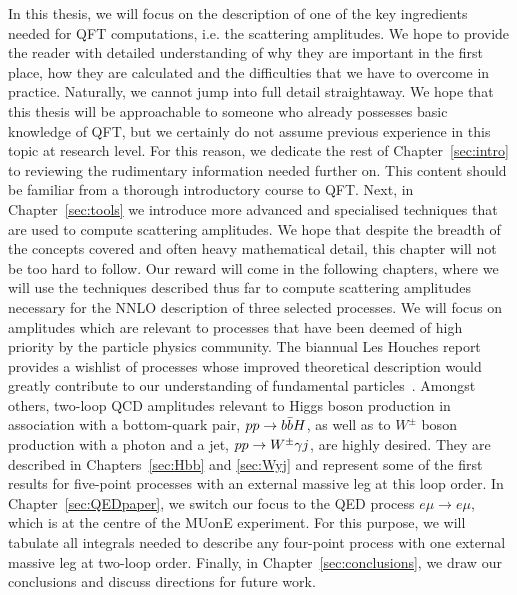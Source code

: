 \documentclass[main.tex]{subfiles}
\begin{document}
In this thesis, we will focus on the description of one of the key ingredients needed for QFT computations, i.e. the scattering amplitudes. We hope to provide the reader with detailed understanding of why they are important in the first place, how they are calculated and the difficulties that we have to overcome in practice. Naturally, we cannot jump into full detail straightaway. We hope that this thesis will be approachable to someone who already possesses basic knowledge of QFT, but we certainly do not assume previous experience in this topic at research level. For this reason, we dedicate the rest of Chapter~\ref{sec:intro} to reviewing the rudimentary information needed further on. This content should be familiar from a thorough introductory course to QFT. Next, in Chapter~\ref{sec:tools} we introduce more advanced and specialised techniques that are used to compute scattering amplitudes. We hope that despite the breadth of the concepts covered and often heavy mathematical detail, this chapter will not be too hard to follow. Our reward will come in the following chapters, where we will use the techniques described thus far to compute scattering amplitudes necessary for the NNLO description of three selected processes. We will focus on amplitudes which are relevant to processes that have been deemed of high priority by the particle physics community. The biannual Les Houches report provides a wishlist of processes whose improved theoretical description would greatly contribute to our understanding of fundamental particles~\cite{Huss:2022ful}. Amongst others, two-loop QCD amplitudes relevant to Higgs boson production in association with a bottom-quark pair, $pp \rightarrow b\bar{b}H$, as well as to $W^\pm$ boson production with a photon and a jet, $pp \rightarrow W^\pm \gamma j$, are highly desired. They are described in Chapters~\ref{sec:Hbb} and \ref{sec:Wyj} and represent some of the first results for five-point processes with an external massive leg at this loop order. In Chapter~\ref{sec:QEDpaper}, we switch our focus to the QED process $e\mu \to e \mu$, which is at the centre of the MUonE experiment. For this purpose, we will tabulate all integrals needed to describe any four-point process with one external massive leg at two-loop order. Finally, in Chapter~\ref{sec:conclusions}, we draw our conclusions and discuss directions for future work.
\end{document}
